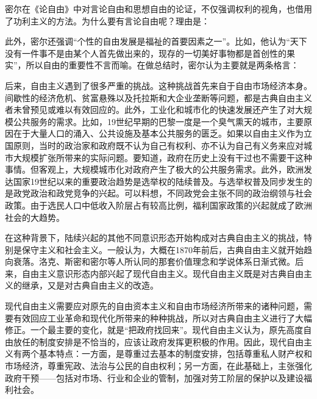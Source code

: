 密尔在《论自由》中对言论自由和思想自由的论证，不仅强调权利的视角，也借用了功利主义的方法。为什么要有言论自由呢？理由是：


此外，密尔还强调“个性的自由发展是福祉的首要因素之一”。比如，他认为“天下没有一件事不是由某个人首先做出来的，现存的一切美好事物都是首创性的果实”，所以自由的重要性不言而喻。在做总结时，密尔认为主要就是两条格言：



后来，自由主义遇到了很多严重的挑战。这种挑战首先来自于自由市场经济本身。间歇性的经济危机、贫富悬殊以及托拉斯和大企业垄断等问题，都是古典自由主义者未曾预见或难以有效回应的。此外，工业化和城市化的快速发展还产生了对大规模公共服务的需求。比如，19世纪早期的巴黎一度是一个臭气熏天的城市，主要原因在于大量人口的涌入、公共设施及基本公共服务的匮乏。如果以自由主义作为立国原则，当时的政治家和政府既不认为自己有权利、亦不认为自己有义务来应对城市大规模扩张所带来的实际问题。要知道，政府在历史上没有干过也不需要干这种事情。但客观上，大规模城市化对政府产生了极大的公共服务需求。此外，欧洲发达国家19世纪以来的重要政治趋势是选举权的陆续普及。与选举权普及同步发生的是政党政治和政党竞争的兴起。可以料想，不同政党会主张不同的政治纲领与社会政策。由于选民人口中低收入阶层占有较高比例，福利国家政策的兴起就成了欧洲社会的大趋势。

在这种背景下，陆续兴起的其他不同意识形态开始构成对古典自由主义的挑战，特别是保守主义和社会主义。一般认为，大概在1870年前后，古典自由主义就开始趋向衰落。洛克、斯密和密尔等人所认同的那套价值理念和学说体系日渐式微。后来，自由主义意识形态内部兴起了现代自由主义。现代自由主义既是对古典自由主义的继承，又是对古典自由主义的改造。

现代自由主义需要应对原先的自由资本主义和自由市场经济所带来的诸种问题，需要有效回应工业革命和现代化所带来的种种挑战，所以对古典自由主义进行了大幅修正。一个最主要的变化，就是“把政府找回来”。现代自由主义认为，原先高度自由放任的制度安排是不恰当的，应该让政府发挥更积极的作用。因此，现代自由主义有两个基本特点：一方面，是尊重过去基本的制度安排，包括尊重私人财产权和市场经济，尊重宪政、法治与公民的自由权利；另一方面，在此基础上，主张强化政府干预——包括对市场、行业和企业的管制，加强对劳工阶层的保护以及建设福利社会。

